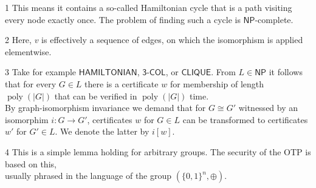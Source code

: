 \documentclass[border=1cm,varwidth=43cm]{standalone}
\DeclareMathOperator\poly{poly}
\newcommand{\complexityProblem}[1]{\textsf{#1}}
\newcommand\NP{\complexityProblem{NP}}
\newcommand\graphpropGraph{G}
\newcommand\graphpropGraphP{G'}
\newcommand\graphpropWitness{w}
\newcommand\graphpropWitnessP{w'}
\begin{document}
\begin{threeparttable}
\begin{tabular}{m{4cm}|m{6cm}|m{6cm}|m{6cm}|m{6cm}|m{6cm}|m{6cm}}
\end{tabular}
\begin{tablenotes}
	\item[1] This means it contains a so-called Hamiltonian cycle that is a path visiting every node exactly once. The problem of finding such a cycle is $\NP$-complete.
	\item[2] Here, $v$ is effectively a sequence of edges, on which the isomorphism is applied elementwise.
	\item[3] Take for example $\complexityProblem{HAMILTONIAN}$, $\complexityProblem{3-COL}$, or $\complexityProblem{CLIQUE}$. From $L \in \NP$ it follows that for every $\graphpropGraph \in L$ there is a certificate $w$ for membership of length $\poly(|\graphpropGraph|)$ that can be verified in $\poly(|\graphpropGraph|)$ time.\\By graph-isomorphism invariance we demand that for $\graphpropGraph \cong \graphpropGraphP$ witnessed by an isomorphim $i \colon \graphpropGraph \to \graphpropGraphP$, certificates $\graphpropWitness$ for $\graphpropGraph \in L$ can be transformed to certificates $\graphpropWitnessP$ for $\graphpropGraphP \in L$. We denote the latter by $i[\graphpropWitness]$.
	\item[4] This is a simple lemma holding for arbitrary groups. The security of the OTP is based on this,\\usually phrased in the language of the group $(\{0,1\}^n, \oplus)$.
\end{tablenotes}
\end{threeparttable}
\end{document}
